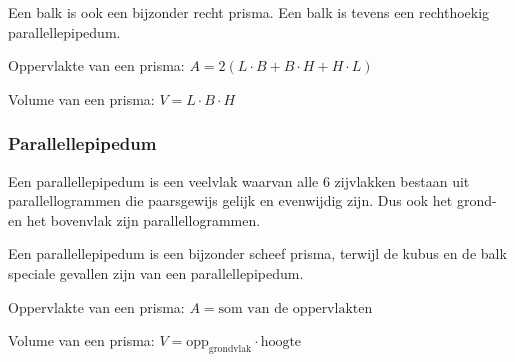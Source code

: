Een balk is ook een bijzonder recht prisma.
Een balk is tevens een rechthoekig parallellepipedum.




\begin{ftonthoud}
			
		Oppervlakte van een prisma: $A=2(L\cdot B+B\cdot H+H\cdot L)$
		
		Volume van een prisma: $V=L\cdot B\cdot H$

\end{ftonthoud}

\subsubsection{Parallellepipedum}
\begin{definitie}
	Een parallellepipedum is een veelvlak waarvan alle 6 zijvlakken bestaan uit parallellogrammen die paarsgewijs gelijk en evenwijdig zijn. Dus ook het grond- en het bovenvlak zijn parallellogrammen. 

\end{definitie}
Een parallellepipedum is een bijzonder scheef prisma, terwijl de kubus en de balk speciale gevallen zijn van een parallellepipedum.




\begin{ftonthoud}
			
		Oppervlakte van een prisma: $A=\text{som van de oppervlakten}$
		
		Volume van een prisma: $V=\text{opp}_{\text{grondvlak}}\cdot \text{hoogte}$

\end{ftonthoud}		

